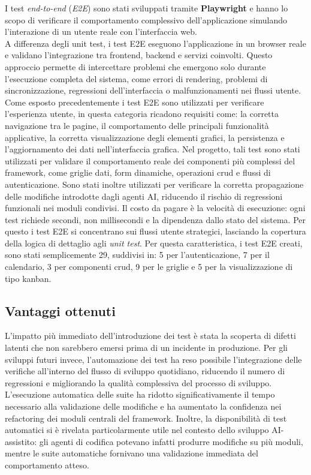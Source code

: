 I test \emph{end-to-end} (\emph{E2E}) sono stati sviluppati tramite
\textbf{Playwright} e hanno lo scopo di verificare il comportamento
complessivo dell’applicazione simulando l’interazione di un utente reale
con l’interfaccia web.\\
A differenza degli unit test, i test E2E eseguono l’applicazione in un browser
reale e validano l’integrazione tra frontend, backend e servizi coinvolti.
Questo approccio permette di intercettare problemi che emergono solo durante
l’esecuzione completa del sistema, come errori di rendering, problemi di
sincronizzazione, regressioni dell’interfaccia o malfunzionamenti nei flussi
utente.\\
Come esposto precedentemente i test E2E sono utilizzati per verificare
l'esperienza utente, in questa categoria ricadono requisiti come:
la corretta navigazione tra le pagine, il comportamento delle principali
funzionalità applicative, la corretta visualizzazione degli elementi grafici,
la persistenza e l’aggiornamento dei dati nell’interfaccia grafica.
Nel progetto, tali test sono stati utilizzati per validare il comportamento
reale dei componenti più complessi del framework, come griglie dati,
form dinamiche, operazioni \gls{crud} e flussi di autenticazione.
Sono stati inoltre utilizzati per verificare la corretta propagazione delle
modifiche introdotte dagli agenti AI, riducendo il rischio di regressioni
funzionali nei moduli condivisi.
Il costo da pagare è la velocità di esecuzione:
ogni test richiede secondi, non millisecondi e la dipendenza dallo stato del
sistema. Per questo i test E2E si concentrano sui flussi utente strategici,
lasciando la copertura della logica di dettaglio agli \emph{unit test}.
Per questa caratteristica, i test E2E creati, sono stati semplicemente 29, suddivisi in:
5 per l'autenticazione, 7 per il calendario, 3 per componenti crud, 9 per le griglie e
5 per la visualizzazione di tipo kanban.

\subsection{Vantaggi ottenuti}

L'impatto più immediato dell'introduzione dei test è stata la scoperta di difetti
latenti che non sarebbero emersi prima di un incidente in produzione.
Per gli sviluppi futuri invece, l’automazione dei test ha reso possibile l’integrazione
delle verifiche all’interno del flusso di sviluppo quotidiano, riducendo il numero di
regressioni e migliorando la qualità complessiva del processo di sviluppo.
L’esecuzione automatica delle suite ha ridotto significativamente il tempo
necessario alla validazione delle modifiche e ha aumentato la confidenza nei
refactoring dei moduli centrali del framework.
Inoltre, la disponibilità di test automatici si è rivelata particolarmente utile nel
contesto dello sviluppo AI-assistito: gli agenti di codifica potevano infatti
produrre modifiche su più moduli, mentre le suite automatiche fornivano una
validazione immediata del comportamento atteso.
